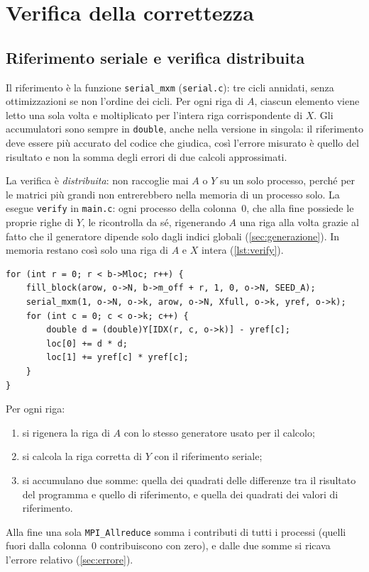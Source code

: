 \documentclass[11pt,a4paper]{article}
\begin{document}
\section{Verifica della correttezza}\label{sec:verifica}

\subsection{Riferimento seriale e verifica distribuita}\label{sec:verifica-distr}

Il riferimento è la funzione \texttt{serial\_mxm} (\texttt{serial.c}): tre
cicli annidati, senza ottimizzazioni se non l'ordine dei cicli. Per ogni riga
di $A$, ciascun elemento viene letto una sola volta e moltiplicato per l'intera
riga corrispondente di $X$. Gli accumulatori sono sempre in \texttt{double},
anche nella versione in singola: il riferimento deve essere più accurato del
codice che giudica, così l'errore misurato è quello del risultato e non la
somma degli errori di due calcoli approssimati.

La verifica è \emph{distribuita}: non
raccoglie mai $A$ o $Y$ su un solo processo, perché per le matrici più grandi
non entrerebbero nella memoria di un processo solo. La esegue
\texttt{verify} in \texttt{main.c}: ogni processo della colonna~0, che alla
fine possiede le proprie righe di $Y$, le ricontrolla da sé, rigenerando $A$
una riga alla volta grazie al fatto che il generatore dipende solo dagli indici
globali (\cref{sec:generazione}). In memoria restano così solo una riga di $A$ e
$X$ intera (\cref{lst:verify}).

\begin{lstlisting}[caption={Verifica delle righe di $Y$ possedute dal processo (\texttt{main.c}).}, label={lst:verify}]
for (int r = 0; r < b->Mloc; r++) {
    fill_block(arow, o->N, b->m_off + r, 1, 0, o->N, SEED_A);
    serial_mxm(1, o->N, o->k, arow, o->N, Xfull, o->k, yref, o->k);
    for (int c = 0; c < o->k; c++) {
        double d = (double)Y[IDX(r, c, o->k)] - yref[c];
        loc[0] += d * d;
        loc[1] += yref[c] * yref[c];
    }
}
\end{lstlisting}

Per ogni riga:
\begin{enumerate}
  \item si rigenera la riga di $A$ con lo stesso generatore usato per il
        calcolo;
  \item si calcola la riga corretta di $Y$ con il riferimento seriale;
  \item si accumulano due somme: quella dei quadrati delle differenze tra il
        risultato del programma e quello di riferimento, e quella dei quadrati
        dei valori di riferimento.
\end{enumerate}
Alla fine una sola \texttt{MPI\_Allreduce} somma i contributi di tutti i
processi (quelli fuori dalla colonna~0 contribuiscono con zero), e dalle due
somme si ricava l'errore relativo (\cref{sec:errore}).
\end{document}
